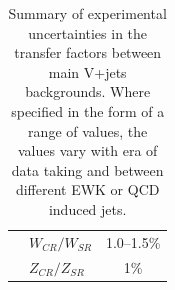 \begin{table}[htbp]
\begin{center}
\begin{tabular}{llc}
                                & $W_{CR}/W_{SR}$               & 1.0--1.5\% \\
                                & $Z_{CR}/Z_{SR}$				& 1\% \\
       \hline
      \end{tabular}
    \end{center}
    \label{tab:systematics}
        \caption{Summary of experimental uncertainties in the transfer factors between main V+jets backgrounds. Where specified in the form of a range of values, the values vary with era of data taking and between different EWK or QCD induced jets.}
\end{table}


